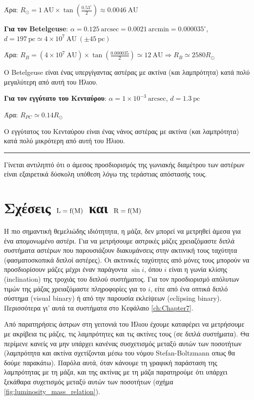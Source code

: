 Άρα: $R_\odot = 1 \ \text{AU} \times \tan \left( \frac{0.53^{\circ}}{2}\right) \approx 0.0046 \ \text{AU}$

\textbf{Για τον Betelgeuse}: $\alpha = 0.125 \ \text{arcsec} = 0.0021 \ \text{arcmin} = 0.000035^{\circ}$, \\ $d=197 \ \text{pc} \simeq 4 \times 10^7 \ \text{AU} \ (\pm 45 \ \text{pc})$

Άρα: $R_B = (4 \times 10^7 \ \text{AU}) \times \tan \left( \frac{0.000035}{2} \right) \simeq 12 \ \text{AU} \Rightarrow R_B \simeq 2580 R_\odot$

O Betelgeuse είναι ένας υπεργίγαντας αστέρας με ακτίνα (και λαμπρότητα) κατά πολύ μεγαλύτερη από αυτή του Ήλιου.

\textbf{Για τον εγγύτατο του Κενταύρου}: $\alpha = 1 \times 10^{-3} \ \text{arcsec}$, $d = 1.3 \ \text{pc}$

Άρα: $R_{PC} \simeq 0.14 R_{\odot}$

Ο εγγύτατος του Κενταύρου είναι ένας νάνος αστέρας με ακτίνα (και λαμπρότητα) κατά πολύ μικρότερη από αυτή του Ήλιου.
{\color{red} \hrule}

Γίνεται αντιληπτό ότι ο άμεσος προσδιορισμός της γωνιακής διαμέτρου των αστέρων είναι εξαιρετικά δύσκολη υπόθεση λόγω της τεράστιας απόστασής τους.


\section{Σχέσεις $\rm L = f(M)$ και $\rm R = f(M)$}
Η πιο σημαντική θεμελιώδης ιδιότητητα, η μάζα, δεν μπορεί να μετρηθεί άμεσα για ένα απομονωμένο αστέρι. Για να μετρήσουμε αστρικές μάζες χρειαζόμαστε διπλά συστήματα αστέρων που παρουσιάζουν διακυμάνσεις στην ακτινική τους ταχύτητα (φασματοσκοπικά διπλοί αστέρες). Οι ακτινικές ταχύτητες από μόνες τους μπορούν να προσδιορίσουν μάζες μέχρι έναν παράγοντα $\sin i$, όπου $i$ είναι η γωνία κλίσης (inclination) της τροχιάς του διπλού συστήματος. Για τον προσδιορισμό απόλυτων τιμών της μάζας χρειαζόμαστε πληροφορίες για το $i$, είτε από ένα οπτικά διπλό σύστημα (visual binary) ή από την παρουσία εκλείψεων (eclipsing binary). Περισσότερα γι' αυτά τα συστήματα στο Κεφάλαιο  \ref{ch:Chapter7}. 

Από παρατηρήσεις άστρων στη γειτονιά του Ήλιου έχουμε καταφέρει να μετρήσουμε με ακρίβεια τις μάζες, τις λαμπρότητες και τις ακτίνες τους (σε διπλά συστήματα). Θα περίμενε κανείς να μην υπάρχει κανένας συσχετισμός μεταξύ αυτών των ποσοτήτων (λαμπρότητα και ακτίνα σχετίζονται μέσω του νόμου Stefan-Boltzmann οπως θα δούμε παρακάτω). Παρόλα αυτά, όταν κάνουμε τη γραφική παράσταση της λαμπρότητας με τη μάζα, και της ακτίνας με τη μάζα παρατηρούμε ότι υπάρχει ξεκάθαρα συχετισμός μεταξύ αυτών των ποσοτήτων (σχήμα \ref{fig:luminosity_mass_relation}).

